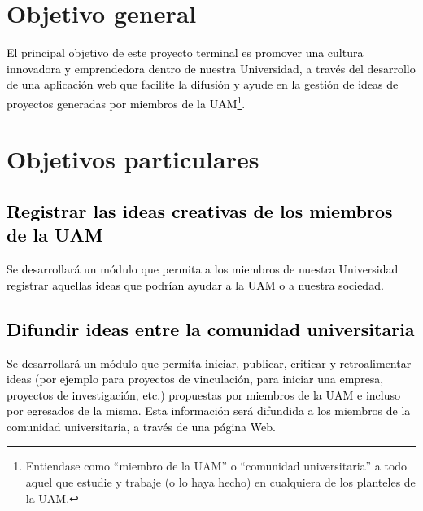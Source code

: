 \documentclass[11pt,letterpaper,titlepage]{article}
\begin{document}
\section{Objetivo general}
\textcolor{black}{El principal objetivo de este proyecto terminal es promover una cultura innovadora y emprendedora dentro de nuestra Universidad, a trav\'es del desarrollo de una aplicaci\'on web que facilite la difusi\'on y ayude en la gesti\'on de ideas de proyectos generadas por miembros de la UAM}\footnote{Entiendase como ``miembro de la UAM'' o ``comunidad universitaria'' a todo aquel que estudie y trabaje (o lo haya hecho) en cualquiera de los planteles de la UAM.}.




\section{Objetivos particulares}
\textcolor{black}{
\subsection{Registrar las ideas creativas de los miembros de la UAM}
Se desarrollar\'a un m\'odulo que permita a los miembros de nuestra Universidad registrar aquellas ideas que podr\'ian ayudar a la UAM o a nuestra sociedad. }


\textcolor{black}{
\subsection{Difundir ideas entre la comunidad universitaria}
Se desarrollar\'a un m\'odulo que permita iniciar, publicar, criticar y retroalimentar ideas (por ejemplo para proyectos de vinculaci\'on, para iniciar una empresa, proyectos de investigaci\'on, etc.) propuestas por miembros de la UAM e incluso por egresados de la misma. Esta informaci\'on ser\'a difundida a los miembros de la comunidad universitaria, a trav\'es de una p\'agina Web.}
\end{document}
